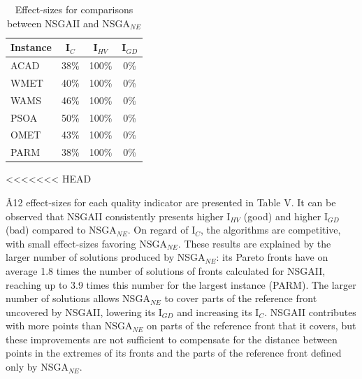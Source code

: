 \documentclass[conference]{IEEEtran}
\begin{document}
\begin{table}[htbp]
  \scriptsize
	\centering
  \caption{Effect-sizes for comparisons between NSGAII and NSGA$_{NE}$}
    \begin{tabular}{lccc}
    \toprule
    \textbf{Instance} & \textbf{I$_{C}$} & \textbf{I$_{HV}$} & \textbf{I$_{GD}$} \\
    \midrule
    ACAD  & 38\%  & 100\% & 0\% \\
    WMET  & 40\%  & 100\% & 0\% \\
    WAMS  & 46\%  & 100\% & 0\% \\
    PSOA  & 50\%  & 100\% & 0\% \\
    OMET  & 43\%  & 100\% & 0\% \\
    PARM  & 38\%  & 100\% & 0\% \\
    \bottomrule
    \end{tabular}%
\end{table}%
<<<<<<< HEAD

{\^A12} effect-sizes for each quality indicator are presented in Table V. It can be observed that NSGAII consistently presents higher I$_{HV}$ (good) and higher I$_{GD}$ (bad) compared to NSGA$_{NE}$. On regard of I$_{C}$, the algorithms are competitive, with small effect-sizes favoring NSGA$_{NE}$. These results are explained by the larger number of solutions produced by NSGA$_{NE}$: its Pareto fronts have on average 1.8 times the number of solutions of fronts calculated for NSGAII, reaching up to 3.9 times this number for the largest instance (PARM). The larger number of solutions allows NSGA$_{NE}$ to cover parts of the reference front uncovered by NSGAII, lowering its I$_{GD}$ and increasing its I$_{C}$. NSGAII contributes with more points than NSGA$_{NE}$ on parts of the reference front that it covers, but these improvements are not sufficient to compensate for the distance between points in the extremes of its fronts and the parts of the reference front defined only by NSGA$_{NE}$.
\end{document}
